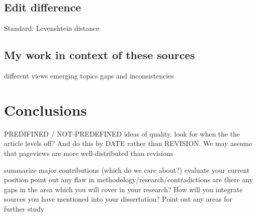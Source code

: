 \documentclass[a4paper,11pt,twoside,notitlepage]{article}
\begin{document}
        \subsection{Edit difference}

        Standard: Levenshtein distance \cite{Levenshtein1966}
        
        \subsection{My work in context of these sources}
        different views
        emerging topics
        gaps and inconsistencies

        \section{Conclusions}

        PREDIFINED / NOT-PREDEFINED ideas of quality. look for when
        the the article levels off? And do this by DATE rather than
        REVISION. We may assume that pageviews are more
        well-distributed than revisions

        summarize major contributions (which do we care about?)
        evaluate your current position
        point out any flaw in methodology/research/contradictions
        are there any gaps in the area which you will cover in your research?
        How will you integrate sources you have mentioned into your dissertation?
        Point out any areas for further study


\end{document}
